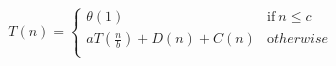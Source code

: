 \begin{ceqn}
\begin{align}
T( n ) = \left\{
\begin{array}{ll}
\theta ( 1 ) & \mathrm {if\ } n \leq c \\
aT(\frac{n}{b}) + D ( n ) + C ( n ) & \mathrm otherwise \\
\end{array}
\right.
\end{align}
\end{ceqn}

\pagebreak